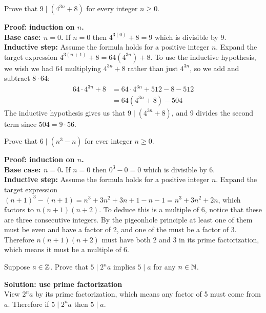 \documentclass{article}
\begin{document}
\begin{problem}
Prove that $9 \mid (4^{3n} + 8)$ for every integer $n \geq 0$.
\end{problem}

\textbf{Proof: induction on $n$.}
\\

\textbf{Base case: $n = 0$.} If $n = 0$ then $4^{3(0)} + 8 = 9$ which is divisible by 9.
\\

\textbf{Inductive step:} Assume the formula holds for a positive integer $n$. Expand the target expression $4^{3(n+1)} + 8 = 64(4^{3n}) + 8$. To use the inductive hypothesis, we wish we had 64 multiplying $4^{3n} + 8$ rather than just $4^{3n}$, so we add and subtract $8 \cdot 64$:
\begin{align*}
    64\cdot 4^{3n} + 8 & = 64 \cdot 4^{3n} + 512 - 8 - 512 \\
                       & = 64(4^{3n} + 8) - 504
\end{align*}
The inductive hypothesis gives us that $9 \mid (4^{3n} + 8)$, and 9 divides the second term since $504 = 9 \cdot 56$.

\begin{problem}
Prove that $6 \mid (n^3 - n)$ for ever integer $n \geq 0$.
\end{problem}

\textbf{Proof: induction on $n$.}
\\

\textbf{Base case: $n = 0$.} If $n = 0$ then $0^3 - 0 = 0$ which is divisible by 6.
\\

\textbf{Inductive step:} Assume the formula holds for a positive integer $n$. Expand the target expression $(n+1)^3 - (n+1) = n^3 + 3n^2 + 3n + 1 - n - 1 = n^3 + 3n^2 + 2n$, which factors to $n(n+1)(n+2)$. To deduce this is a multiple of 6, notice that these are three consecutive integers. By the pigeonhole principle at least one of them must be even and have a factor of 2, and one of the must be a factor of 3. Therefore $n(n+1)(n+2)$ must have both 2 and 3 in its prime factorization, which means it must be a multiple of 6.

\begin{problem}
Suppose $a \in \mathbb{Z}$. Prove that $5 \mid 2^n a$ implies $5 \mid a$ for any $n \in \mathbb{N}$.
\end{problem}
\textbf{Solution: use prime factorization}
\\

View $2^n a$ by its prime factorization, which means any factor of 5 must come from $a$. Therefore if $5 \mid 2^n a$ then $5 \mid a$.
\end{document}
